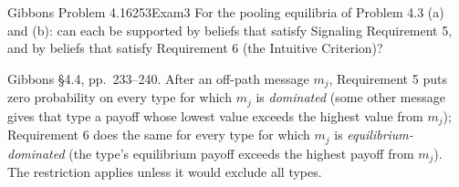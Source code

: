 \begin{exsol}{Gibbons Problem 4.16}{253}{Exam}{3}
\asked For the pooling equilibria of Problem 4.3 (a) and (b): can each be supported by beliefs that
satisfy Signaling Requirement 5, and by beliefs that satisfy Requirement 6 (the Intuitive Criterion)?

\method Gibbons \S4.4, pp.~233--240. After an off-path message $m_j$, Requirement 5 puts zero
probability on every type for which $m_j$ is \emph{dominated} (some other message gives that type a
payoff whose lowest value exceeds the highest value from $m_j$); Requirement 6 does the same for every
type for which $m_j$ is \emph{equilibrium-dominated} (the type's equilibrium payoff exceeds the highest
payoff from $m_j$). The restriction applies unless it would exclude all types.


\end{exsol}
